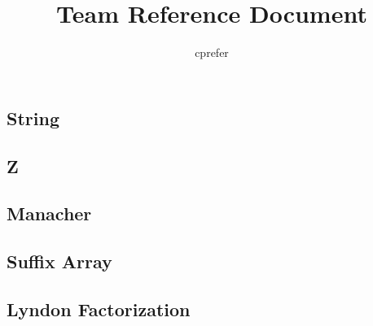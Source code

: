 \documentclass{article}
\begin{document}
\title{Team Reference Document}
\author{cprefer}
\maketitle
\newpage
\begin{multicols}{2}
    \tableofcontents
    \section{String}
    \subsection{Z}
    
    \subsection{Manacher}
    
    \subsection{Suffix Array}
    
    \subsection{Lyndon Factorization}
    
\end{multicols}
\end{document}
